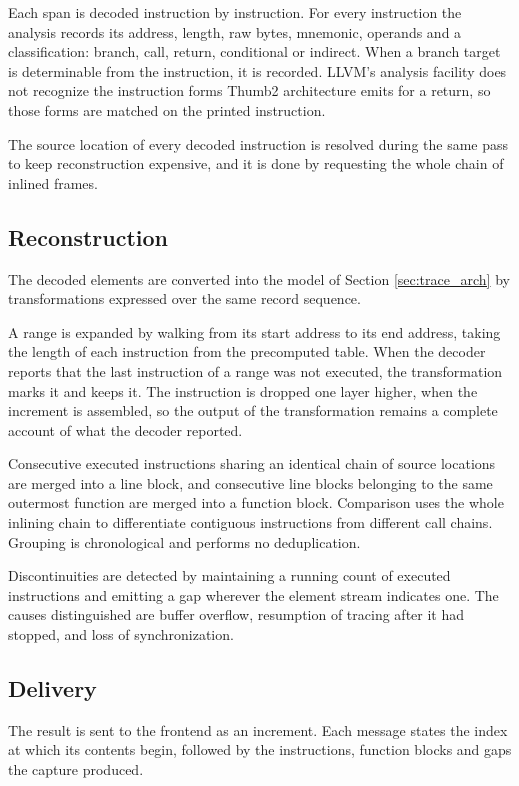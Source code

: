 Each span is decoded instruction by instruction. For every instruction the analysis records its address, length, raw bytes, mnemonic, operands and a classification: branch, call, return, conditional or indirect. When a branch target is determinable from the instruction, it is recorded. LLVM's analysis facility does not recognize the instruction forms Thumb2 architecture emits for a return, so those forms are matched on the printed instruction.

The source location of every decoded instruction is resolved during the same pass to keep reconstruction expensive, and it is done  by requesting the whole chain of inlined frames.


\subsection{Reconstruction}

The decoded elements are converted into the model of Section \ref{sec:trace_arch} by transformations expressed over the same record sequence.

A range is expanded by walking from its start address to its end address, taking the length of each instruction from the precomputed table. When the decoder reports that the last instruction of a range was not executed, the transformation marks it and keeps it. The instruction is dropped one layer higher, when the increment is assembled, so the output of the transformation remains a complete account of what the decoder reported.

Consecutive executed instructions sharing an identical chain of source locations are merged into a line block, and consecutive line blocks belonging to the same outermost function are merged into a function block. Comparison uses the whole inlining chain to differentiate contiguous instructions from different call chains. Grouping is chronological and performs no deduplication.

Discontinuities are detected by maintaining a running count of executed instructions and emitting a gap wherever the element stream indicates one. The causes distinguished are buffer overflow, resumption of tracing after it had stopped, and loss of synchronization.


\subsection{Delivery}
The result is sent to the frontend as an increment. Each message states the index at which its contents begin, followed by the instructions, function blocks and gaps the capture produced.

